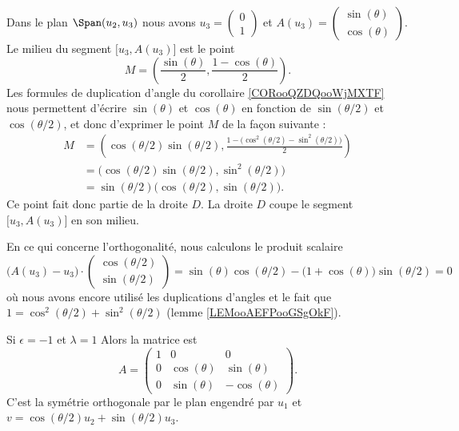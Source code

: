 \begin{subproof}
    Dans le plan \( \Span(u_2,u_3)\) nous avons \( u_3=\begin{pmatrix}
        0    \\ 
        1    
    \end{pmatrix}\) et \( A(u_3)=\begin{pmatrix}
        \sin(\theta)    \\ 
        \cos(\theta)    
    \end{pmatrix}\). Le milieu du segment \( \mathopen[ u_3 , A(u_3) \mathclose]\) est le point
    \begin{equation}
        M=\left( \frac{ \sin(\theta) }{2},\frac{ 1-\cos(\theta) }{2} \right).
    \end{equation}
    Les formules de duplication d'angle du corollaire \ref{CORooQZDQooWjMXTF} nous permettent d'écrire \( \sin(\theta)\) et \( \cos(\theta)\) en fonction de \( \sin(\theta/2)\) et \( \cos(\theta/2)\), et donc d'exprimer le point \( M\) de la façon suivante :
    \begin{subequations}
        \begin{align}
            M&=\left( \cos(\theta/2)\sin(\theta/2),\frac{ 1-\big( \cos^2(\theta/2)-\sin^2(\theta/2) \big) }{2} \right)\\
            &=\big( \cos(\theta/2)\sin(\theta/2),\sin^2(\theta/2) \big)\\
            &=\sin(\theta/2)\big( \cos(\theta/2),\sin(\theta/2) \big).
        \end{align}
    \end{subequations}
    Ce point fait donc partie de la droite \( D\). La droite \( D\) coupe le segment \( \mathopen[ u_3 , A(u_3) \mathclose]\) en son milieu.

    En ce qui concerne l'orthogonalité, nous calculons le produit scalaire
    \begin{equation}
            \big( A(u_3)-u_3 \big)\cdot\begin{pmatrix}
                \cos(\theta/2)    \\ 
                \sin(\theta/2)    
            \end{pmatrix}
            =\sin(\theta)\cos(\theta/2)-\big( 1+\cos(\theta) \big)\sin(\theta/2)=0
    \end{equation}
    où nous avons encore utilisé les duplications d'angles et le fait que \( 1=\cos^2(\theta/2)+\sin^2(\theta/2)\) (lemme \ref{LEMooAEFPooGSgOkF}).

    \item[Si \( \epsilon=-1\) et \( \lambda=1\)] Alors la matrice est
        \begin{equation}
            A=\begin{pmatrix}
                1    &   0    &   0    \\
                0    &   \cos(\theta)    &   \sin(\theta)    \\
                0    &   \sin(\theta)    &   -\cos(\theta)
            \end{pmatrix}.
        \end{equation}
        C'est la symétrie orthogonale par le plan engendré par \( u_1\) et \( v=\cos(\theta/2)u_2+\sin(\theta/2)u_3\).


\end{subproof}

